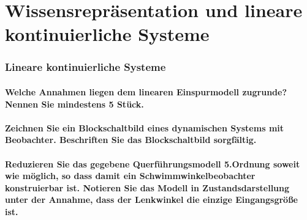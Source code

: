 \part{Wissensrepräsentation und lineare kontinuierliche Systeme}
\section{Lineare kontinuierliche Systeme}
\subsection{}
\textbf{Welche Annahmen liegen dem linearen Einspurmodell zugrunde? Nennen Sie mindestens 5 Stück.}

\subsection{}
\textbf{Zeichnen Sie ein Blockschaltbild eines dynamischen Systems mit Beobachter. Beschriften Sie das Blockschaltbild sorgfältig.}

\subsection{}
\textbf{Reduzieren Sie das gegebene Querführungsmodell 5.Ordnung soweit wie möglich, so dass damit ein Schwimmwinkelbeobachter konstruierbar ist. Notieren Sie das Modell in Zustandsdarstellung unter der Annahme, dass der Lenkwinkel die einzige Eingangsgröße ist.}

